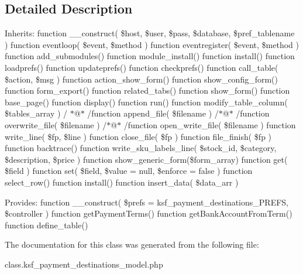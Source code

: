 \subsection{Detailed Description}
Inherits\+: function \+\_\+\+\_\+construct( \$host, \$user, \$pass, \$database, \$pref\+\_\+tablename ) function eventloop( \$event, \$method ) function eventregister( \$event, \$method ) function add\+\_\+submodules() function module\+\_\+install() function install() function loadprefs() function updateprefs() function checkprefs() function call\+\_\+table( \$action, \$msg ) function action\+\_\+show\+\_\+form() function show\+\_\+config\+\_\+form() function form\+\_\+export() function related\+\_\+tabs() function show\+\_\+form() function base\+\_\+page() function display() function run() function modify\+\_\+table\+\_\+column( \$tables\+\_\+array ) / $\ast$@$\ast$ /function append\+\_\+file( \$filename ) /$\ast$@$\ast$ /function overwrite\+\_\+file( \$filename ) /$\ast$@$\ast$ /function open\+\_\+write\+\_\+file( \$filename ) function write\+\_\+line( \$fp, \$line ) function close\+\_\+file( \$fp ) function file\+\_\+finish( \$fp ) function backtrace() function write\+\_\+sku\+\_\+labels\+\_\+line( \$stock\+\_\+id, \$category, \$description, \$price ) function show\+\_\+generic\+\_\+form(\$form\+\_\+array) function get( \$field ) function set( \$field, \$value = null, \$enforce = false ) function select\+\_\+row() function install() function insert\+\_\+data( \$data\+\_\+arr )

Provides\+: function \+\_\+\+\_\+construct( \$prefs = ksf\+\_\+payment\+\_\+destinations\+\_\+\+P\+R\+E\+FS, \$controller ) function get\+Payment\+Terms() function get\+Bank\+Account\+From\+Term() function define\+\_\+table() 

The documentation for this class was generated from the following file\+:\begin{DoxyCompactItemize}
\item 
class.\+ksf\+\_\+payment\+\_\+destinations\+\_\+model.\+php\end{DoxyCompactItemize}
